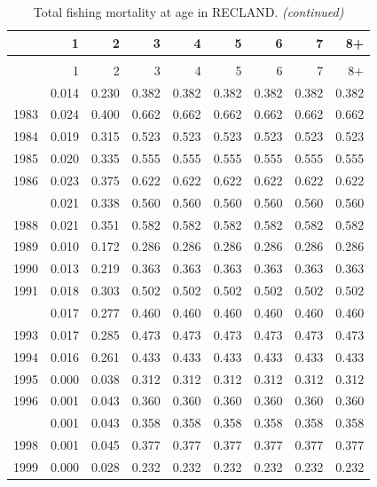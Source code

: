 \documentclass[
]{article}
\begin{document}
\begin{longtable}[t]{lrrrrrrrr}
\caption{\label{tab:RECLAND-fleet-FAA-table}Total fishing mortality at age in RECLAND.}\\
\toprule
  & 1 & 2 & 3 & 4 & 5 & 6 & 7 & 8+\\
\midrule
\endfirsthead
\caption[]{Total fishing mortality at age in RECLAND. \textit{(continued)}}\\
\toprule
  & 1 & 2 & 3 & 4 & 5 & 6 & 7 & 8+\\
\midrule
\endhead

\endfoot
\bottomrule
\endlastfoot
1982 & 0.014 & 0.230 & 0.382 & 0.382 & 0.382 & 0.382 & 0.382 & 0.382\\
1983 & 0.024 & 0.400 & 0.662 & 0.662 & 0.662 & 0.662 & 0.662 & 0.662\\
1984 & 0.019 & 0.315 & 0.523 & 0.523 & 0.523 & 0.523 & 0.523 & 0.523\\
1985 & 0.020 & 0.335 & 0.555 & 0.555 & 0.555 & 0.555 & 0.555 & 0.555\\
1986 & 0.023 & 0.375 & 0.622 & 0.622 & 0.622 & 0.622 & 0.622 & 0.622\\
\addlinespace
1987 & 0.021 & 0.338 & 0.560 & 0.560 & 0.560 & 0.560 & 0.560 & 0.560\\
1988 & 0.021 & 0.351 & 0.582 & 0.582 & 0.582 & 0.582 & 0.582 & 0.582\\
1989 & 0.010 & 0.172 & 0.286 & 0.286 & 0.286 & 0.286 & 0.286 & 0.286\\
1990 & 0.013 & 0.219 & 0.363 & 0.363 & 0.363 & 0.363 & 0.363 & 0.363\\
1991 & 0.018 & 0.303 & 0.502 & 0.502 & 0.502 & 0.502 & 0.502 & 0.502\\
\addlinespace
1992 & 0.017 & 0.277 & 0.460 & 0.460 & 0.460 & 0.460 & 0.460 & 0.460\\
1993 & 0.017 & 0.285 & 0.473 & 0.473 & 0.473 & 0.473 & 0.473 & 0.473\\
1994 & 0.016 & 0.261 & 0.433 & 0.433 & 0.433 & 0.433 & 0.433 & 0.433\\
1995 & 0.000 & 0.038 & 0.312 & 0.312 & 0.312 & 0.312 & 0.312 & 0.312\\
1996 & 0.001 & 0.043 & 0.360 & 0.360 & 0.360 & 0.360 & 0.360 & 0.360\\
\addlinespace
1997 & 0.001 & 0.043 & 0.358 & 0.358 & 0.358 & 0.358 & 0.358 & 0.358\\
1998 & 0.001 & 0.045 & 0.377 & 0.377 & 0.377 & 0.377 & 0.377 & 0.377\\
1999 & 0.000 & 0.028 & 0.232 & 0.232 & 0.232 & 0.232 & 0.232 & 0.232\\

\end{longtable}
\end{document}
